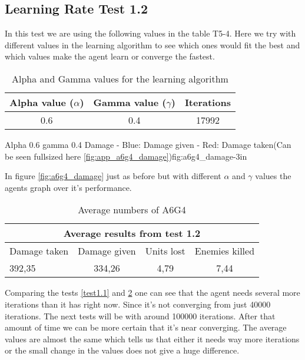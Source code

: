 \subsection*{Learning Rate Test 1.2}
In this test we are using the following values in the table T5-4. Here we try with different values in the learning algorithm to see which ones would fit the best and which values make the agent learn or converge the fastest.


\begin{table}[H]
\begin{centering}

 \begin{tabular}{|c|c|c|}
	\hline
		Alpha value ($\alpha$) & Gamma value ($\gamma$) & Iterations\\
	\hline
		0.6 & 0.4 & 17992 \\
	\hline
\end{tabular}
\label{a6g4_table}
\caption{Alpha and Gamma values for the learning algorithm}
\end{centering}

\end{table}


			{Alpha 0.6 gamma 0.4 Damage - Blue: Damage given - Red: Damage taken(Can be seen fullsized here \ref{fig:app_a6g4_damage})}{fig:a6g4_damage}{-3in}

In figure \ref{fig:a6g4_damage} just as before but with different $\alpha$ and $\gamma$ values the agents graph over it's performance.






\begin{table}
\begin{centering}

 \begin{tabular}{|l|c|c|c|}
	\multicolumn{4}{c}{Average results from test 1.2} \\
	\hline
		Damage taken & Damage given & Units lost & Enemies killed\\
	\hline
		392,35 & 334,26 & 4,79 & 7,44 \\
	\hline
\end{tabular}
\caption{Average numbers of A6G4}
\label{test1.2}
\end{centering}

\end{table}

Comparing the tests \ref{test1.1} and \ref{test1.2} one can see that the agent needs several more iterations than it has right now. Since it's not converging from just 40000 iterations. The next tests will be with around 100000 iterations. After that amount of time we can be more certain that it's near converging. The average values are almost the same which tells us that either it needs way more iterations or the small change in the values does not give a huge difference.